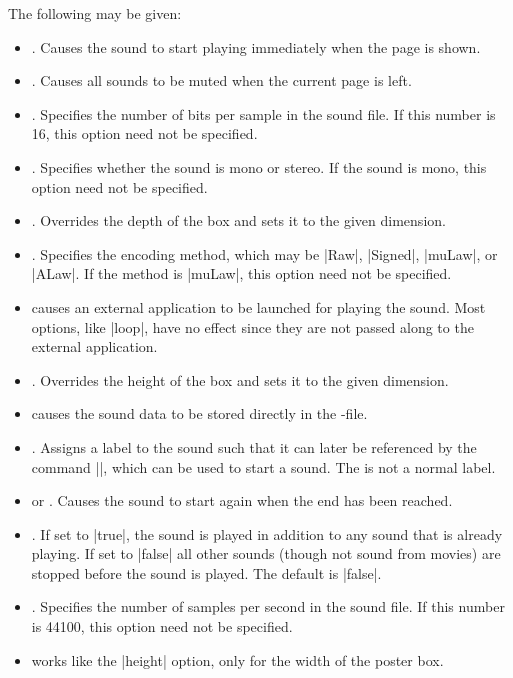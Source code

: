 \begin{command}{\sound{}}
  The following  may be given:
  \begin{itemize}
  \item
    . Causes the sound to start playing immediately when the page is shown.
  \item
    . Causes all sounds to be muted when the current page is left.
  \item
    . Specifies the number of bits per sample in the sound file. If this number is 16, this option need not be specified.
  \item
    . Specifies whether the sound is mono or stereo. If the sound is mono, this option need not be specified.
  \item
    . Overrides the depth of the  box and sets it to the given dimension.
  \item
    . Specifies the encoding method, which may be |Raw|, |Signed|, |muLaw|, or |ALaw|. If the method is |muLaw|, this option need not be specified.
  \item
     causes an external application to be launched for playing the sound. Most options, like |loop|, have no effect since they are not passed along to the external application.
  \item
    . Overrides the height of the  box and sets it to the given dimension.
  \item
     causes the sound data to be stored directly in the \pdf-file.
  \item
    . Assigns a label to the sound such that it can later be referenced by the command |\hyperlinksound|, which can be used to start a sound. The  is not a normal label.
  \item
     or . Causes the sound to start again when the end has been reached.
  \item
    . If set to |true|, the sound is played in addition to any sound that is already playing. If set to |false| all other sounds (though not sound from movies) are stopped before the sound is played. The default is |false|.
  \item
    . Specifies the number of samples per second in the sound file. If this number is 44100, this option need not be specified.
  \item
     works like the |height| option, only for the width of the poster box.
  \end{itemize}


\end{command}
